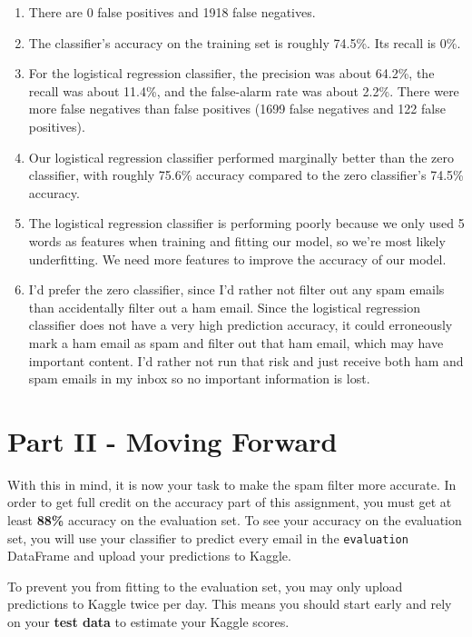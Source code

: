\documentclass[11pt]{article}
\begin{document}
    \begin{enumerate}
\def\labelenumi{(\alph{enumi})}
\item
  There are 0 false positives and 1918 false negatives.
\item
  The classifier's accuracy on the training set is roughly 74.5\%. Its
  recall is 0\%.
\item
  For the logistical regression classifier, the precision was about
  64.2\%, the recall was about 11.4\%, and the false-alarm rate was
  about 2.2\%. There were more false negatives than false positives
  (1699 false negatives and 122 false positives).
\item
  Our logistical regression classifier performed marginally better than
  the zero classifier, with roughly 75.6\% accuracy compared to the zero
  classifier's 74.5\% accuracy.
\item
  The logistical regression classifier is performing poorly because we
  only used 5 words as features when training and fitting our model, so
  we're most likely underfitting. We need more features to improve the
  accuracy of our model.
\item
  I'd prefer the zero classifier, since I'd rather not filter out any
  spam emails than accidentally filter out a ham email. Since the
  logistical regression classifier does not have a very high prediction
  accuracy, it could erroneously mark a ham email as spam and filter out
  that ham email, which may have important content. I'd rather not run
  that risk and just receive both ham and spam emails in my inbox so no
  important information is lost.
\end{enumerate}

    \section{Part II - Moving Forward}\label{part-ii---moving-forward}

With this in mind, it is now your task to make the spam filter more
accurate. In order to get full credit on the accuracy part of this
assignment, you must get at least \textbf{88\%} accuracy on the
evaluation set. To see your accuracy on the evaluation set, you will use
your classifier to predict every email in the \texttt{evaluation}
DataFrame and upload your predictions to Kaggle.

To prevent you from fitting to the evaluation set, you may only upload
predictions to Kaggle twice per day. This means you should start early
and rely on your \textbf{test data} to estimate your Kaggle scores.
\end{document}
